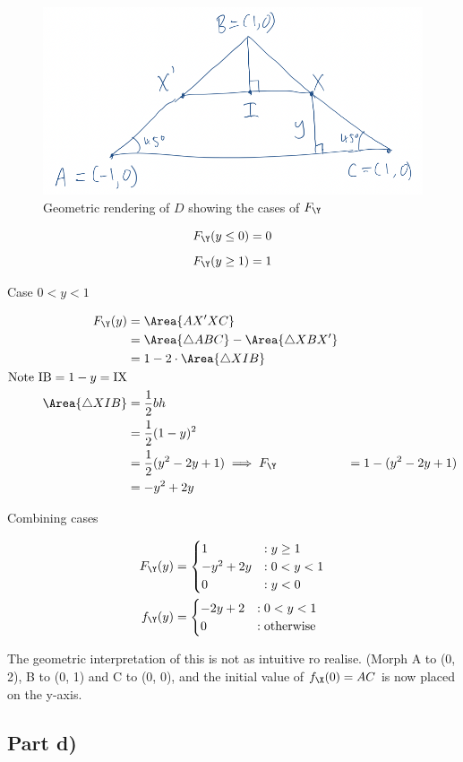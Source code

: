 \begin{figure}[ht]
	\includegraphics[width=1 \textwidth]{Q2c Y diagram.png}
	\caption{Geometric rendering of $D$ showing the cases of $F_\Y$}
	\label{fig:q2c-y}
\end{figure}

\[
F_\Y(y \leq 0) = 0
\]
\[
F_\Y(y \geq 1) = 1
\]

Case $0 < y < 1$

\begin{align*}
F_\Y(y) &= \Area{AX'XC} \\
&= \Area{\triangle ABC} - \Area{\triangle XBX'} \\
&= 1 - 2 \cdot \Area{\triangle XIB} \\
\text{Note } \mathrm{IB} = 1 - y = \mathrm{IX} \\
\Area{\triangle XIB} &= \frac{1}{2}bh \\
&= \frac{1}{2}(1 - y)^2 \\
&= \frac{1}{2}(y^2 - 2y + 1)
\implies F_\Y &= 1 - (y^2 - 2y + 1) \\
&= -y^2 + 2y
\end{align*}

Combining cases

\begin{align*}
F_\Y(y) &= \begin{cases}
1 &: y \geq 1 \\
-y^2 +2y &: 0 < y < 1 \\
0 &: y < 0 \\
\end{cases} \\
f_\Y(y) &= \begin{cases}
-2y + 2 &: 0 < y < 1 \\
0 &: \text{otherwise}
\end{cases}
\end{align*}

The geometric interpretation of this is not as intuitive ro realise.
(Morph A to (0, 2), B to (0, 1) and C to (0, 0), and the initial
value of $f_\X(0) = AC$ is now placed on the y-axis.

\subsection{Part d)}
